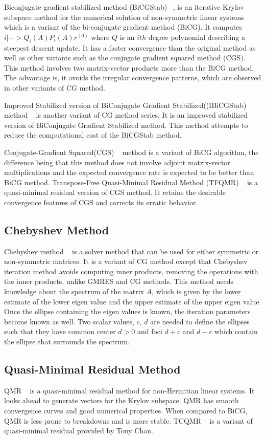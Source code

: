 Biconjugate gradient stabilized method (BiCGStab) ~\cite{bicgstab}, is an iterative Krylov subspace method for the numerical solution of non-symmetric linear systems which is a variant of the bi-conjugate gradient method (BiCG). It computes $i |->Q_i(A)P_i(A)r^{(0)}$ where $Q$ is an $ith$ degree polynomial describing a steepest descent update. It has a faster convergence than the original method as well as other variants such as the conjugate gradient squared method (CGS). This method involves two matrix-vector products more than the BiCG method. The advantage is, it avoids the irregular convergence patterns, which are observed in other variants of CG method. 

Improved Stabilized version of BiConjugate Gradient Stabilized((IBiCGStab) method ~\cite{ibcgs} is another variant of CG method series. It is an improved stabilized version of BiConjugate Gradient Stabilized method. This method attempts to reduce the computational cost of the BiCGStab method. 

Conjugate-Gradient Squared(CGS) ~\cite{cgs} method is a variant of BiCG algorithm, the difference being that this method does not involve adjoint matrix-vector multiplications and the expected convergence rate is expected to be better than BiCG method. Transpose-Free Quasi-Minimal Residual Method (TFQMR) ~\cite{tfqmr} is a quasi-minimal residual version of CGS method. It retains the desirable convergence features of CGS and corrects its erratic behavior.

\subsection{Chebyshev Method}
Chebyshev method ~\cite{chebyshev} is a solver method that can be used for either symmetric or non-symmetric matrices. It is a variant of CG method except that Chebyshev iteration method avoids computing inner products, removing the operations with the inner products, unlike GMRES and CG methods. This method needs knowledge about the spectrum of the matrix $A$, which is given by the lower estimate of the lower eigen value and the upper estimate of the upper eigen value. Once the ellipse containing the eigen values is known, the iteration parameters become known as well. Two scalar values, $c$, $d$ are needed to define the ellipses such that they have common center $d>0$ and foci $d+c$ and $d-c$ which contain the ellipse that surrounds the spectrum. 
\subsection{Quasi-Minimal Residual Method}
QMR ~\cite{qmr} is a quasi-minimal residual method for non-Hermitian linear systems. It looks ahead to generate vectors for the Krylov subspace. QMR has smooth convergence curves and good numerical properties. When compared to BiCG, QMR is less prone to breakdowns and is more stable. TCQMR ~\cite{overview} is a variant of quasi-minimal residual provided by Tony Chan. 

